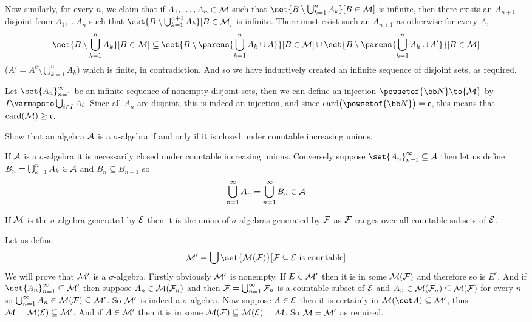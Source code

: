     Now similarly, for every $n$, we claim that if $A_1,\dots,A_n\in{\cal M}$ such that $\set{B\setminus\bigcup_{k=1}^n A_k}[B\in{\cal M}]$ is infinite, then there exists an $A_{n+1}$ disjoint from
    $A_1,\dots A_n$ such that $\set{B\setminus\bigcup_{k=1}^{n+1}A_k}[B\in{\cal M}]$ is infinite.
    There must exist such an $A_{n+1}$ as otherwise for every $A$,
    $$ \set{B\setminus\bigcup_{k=1}^nA_k}[B\in{\cal M}] \subseteq \set{B\setminus\parens{\bigcup_{k=1}^nA_k\cup A}}[B\in{\cal M}]\cup\set{B\setminus\parens{\bigcup_{k=1}^nA_k\cup A'}}[B\in{\cal M}] $$
    ($A'=A^c\setminus\bigcup_{k=1}^nA_k$) which is finite, in contradiction.
    And so we have inductively created an infinite sequence of disjoint sets, as required.
    \item Let $\set{A_n}_{n=1}^\infty$ be an infinite sequence of nonempty disjoint sets, then we can define an injection $\powsetof{{\bb N}}\to{\cal M}$ by $I\varmapsto\bigcup_{i\in I}A_i$.
    Since all $A_n$ are disjoint, this is indeed an injection, and since ${\rm card}\bigl(\powsetof{{\bb N}}\bigr)={\frak c}$, this means that ${\rm card}({\cal M})\geq{\frak c}$.
\eenum

\bexerc

    Show that an algebra ${\cal A}$ is a $\sigma$-algebra if and only if it is closed under countable increasing unions.

\eexerc

If ${\cal A}$ is a $\sigma$-algebra it is necessarily closed under countable increasing unions.
Conversely suppose $\set{A_n}_{n=1}^\infty\subseteq{\cal A}$ then let us define $B_n=\bigcup_{k=1}^n A_k\in{\cal A}$ and $B_n\subseteq B_{n+1}$ so
$$ \bigcup_{n=1}^\infty A_n = \bigcup_{n=1}^\infty B_n \in {\cal A} $$

\bexerc

    If ${\cal M}$ is the $\sigma$-algebra generated by ${\cal E}$ then it is the union of $\sigma$-algebras generated by ${\cal F}$ as ${\cal F}$ ranges over all countable subsets of ${\cal E}$.

\eexerc

Let us define
$$ {\cal M}' = \bigcup\set{{\cal M}({\cal F})}[{\cal F}\subseteq{\cal E}\hbox{ is countable}] $$
We will prove that ${\cal M}'$ is a $\sigma$-algebra.
Firstly obviously ${\cal M}'$ is nonempty.
If $E\in{\cal M}'$ then it is in some ${\cal M}({\cal F})$ and therefore so is $E^c$.
And if $\set{A_n}_{n=1}^\infty\subseteq{\cal M}'$ then suppose $A_n\in{\cal M}({\cal F}_n)$ and then ${\cal F}=\bigcup_{n=1}^\infty{\cal F}_n$ is a countable subset of ${\cal E}$ and
$A_n\in{\cal M}({\cal F}_n)\subseteq{\cal M}({\cal F})$ for every $n$ so $\bigcup_{n=1}^\infty A_n\in{\cal M}({\cal F})\subseteq{\cal M}'$.
So ${\cal M}'$ is indeed a $\sigma$-algebra.
Now suppose $A\in{\cal E}$ then it is certainly in ${\cal M}(\set A)\subseteq{\cal M}'$, thus ${\cal M}={\cal M}({\cal E})\subseteq{\cal M}'$.
And if $A\in{\cal M}'$ then it is in some ${\cal M}({\cal F})\subseteq{\cal M}({\cal E})={\cal M}$.
So ${\cal M}={\cal M}'$ as required.

